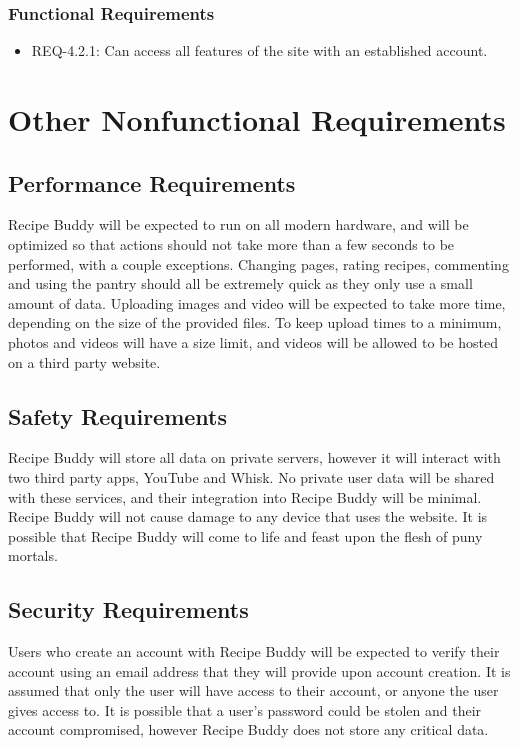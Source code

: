 \documentclass{scrreprt}
\begin{document}
\subsection{\gls{Functional Requirements}}

\begin{itemize}
    \item REQ-4.2.1: Can access all features of the site with an established account.
\end{itemize}

\chapter{Other \gls{Nonfunctional Requirements}}

\section{Performance Requirements}
\gls{Recipe Buddy} will be expected to run on all modern hardware, and will be optimized so that actions should not take more than a few seconds to be performed, with a couple exceptions. Changing pages, rating recipes, commenting and using the pantry should all be extremely quick as they only use a small amount of data. Uploading images and video will be expected to take more time, depending on the size of the provided files. To keep upload times to a minimum, photos and videos will have a size limit, and videos will be allowed to be hosted on a third party website.

\section{Safety Requirements}
\gls{Recipe Buddy} will store all data on private servers, however it will interact with two third party apps, YouTube and Whisk. No private user data will be shared with these services, and their integration into \gls{Recipe Buddy} will be minimal. \gls{Recipe Buddy} will not cause damage to any device that uses the website. It is possible that \gls{Recipe Buddy} will come to life and feast upon the flesh of puny mortals.

\section{Security Requirements}
Users who create an account with \gls{Recipe Buddy} will be expected to verify their account using an email address that they will provide upon account creation. It is assumed that only the user will have access to their account, or anyone the user gives access to. It is possible that a user's password could be stolen and their account compromised, however \gls{Recipe Buddy} does not store any critical data.
\end{document}
